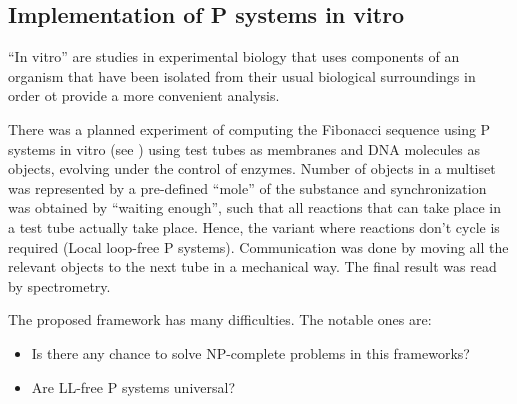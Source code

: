 
\subsection{Implementation of P systems in vitro} %
\label{sub:implementation_of_p_systems_in_vitro}

``In vitro'' are studies in experimental biology that uses components of an organism that have been isolated from their usual biological surroundings in order ot provide a more convenient analysis.

There was a planned experiment of computing the Fibonacci sequence using P systems in vitro (see \cite{Gershoni:2008:InVitro}) using test tubes as membranes and DNA molecules as objects, evolving under the control of enzymes.
Number of objects in a multiset was represented by a pre-defined ``mole'' of the substance and synchronization was obtained by ``waiting enough'', such that all reactions that can take place in a test tube actually take place. Hence, the variant where reactions don't cycle is required (Local loop-free P systems).
Communication was done by moving all the relevant objects to the next tube in a mechanical way. The final result was read by spectrometry.

The proposed framework has many difficulties. The notable ones are:

\begin{itemize}
  \item Is there any chance to solve NP-complete problems in this frameworks?
  \item Are LL-free P systems universal?
\end{itemize}


